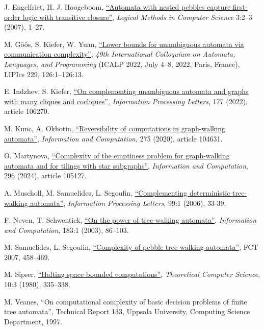 \documentclass[12pt,a4paper]{article}
\theoremstyle{definition}
\begin{document}
\begin{thebibliography}{99}
 J. Engelfriet, H. J. Hoogeboom,
	\href{http://dx.doi.org/10.2168/LMCS-3(2:3)2007}
	{``Automata with nested pebbles capture first-order logic with transitive closure''},
	\emph{Logical Methods in Computer Science}
	3:2--3 (2007), 1--27.

 M. G\"o\"os, S. Kiefer, W. Yuan,
	\href{https://doi.org/10.4230/LIPIcs.ICALP.2022.126}
	{``Lower bounds for unambiguous automata via communication complexity''},
	\emph{49th International Colloquium on Automata, Languages, and Programming}
	(ICALP 2022, July 4--8, 2022, Paris, France),
	LIPIcs 229, 126:1--126:13.

 E. Indzhev, S. Kiefer,
	\href{https://doi.org/10.1016/j.ipl.2022.106270}
	{``On complementing unambiguous automata and graphs with many cliques and cocliques''},
	\emph{Information Processing Letters},
	177 (2022), article 106270.

 M. Kunc, A. Okhotin,
	\href{https://doi.org/10.1016/j.ic.2020.104631}
	{``Reversibility of computations in graph-walking automata''},
	\emph{Information and Computation},
	275 (2020), article 104631.

 O. Martynova,
	\href{https://doi.org/10.1016/j.ic.2023.105127}
	{``Complexity of the emptiness problem for graph-walking automata and for tilings with star subgraphs''},
	\emph{Information and Computation},
	296 (2024), article 105127.

 A. Muscholl, M. Samuelides, L. Segoufin,
	\href{http://dx.doi.org/10.1016/j.ipl.2005.09.017}
	{``Complementing deterministic tree-walking automata''},
	\emph{Information Processing Letters},
	99:1 (2006), 33-39.

 F. Neven, T. Schwentick,
	\href{https://doi.org/10.1016/S0890-5401(03)00013-0}
	{``On the power of tree-walking automata''},
	\emph{Information and Computation},
	183:1 (2003), 86--103.

 M. Samuelides, L. Segoufin,
	\href{https://doi.org/10.1007/978-3-540-74240-1_40}
	{``Complexity of pebble tree-walking automata''},
	FCT 2007, 458--469.

 M. Sipser,
	\href{http://dx.doi.org/10.1016/0304-3975(80)90053-5}
	{``Halting space-bounded computations''},
	\emph{Theoretical Computer Science},
	10:3 (1980), 335--338.

 M. Veanes,
	{``On computational complexity of basic decision problems of finite tree automata''},
	Technical Report 133, Uppsala University, Computing Science Department,
	1997.

\end{thebibliography}
\end{document}
